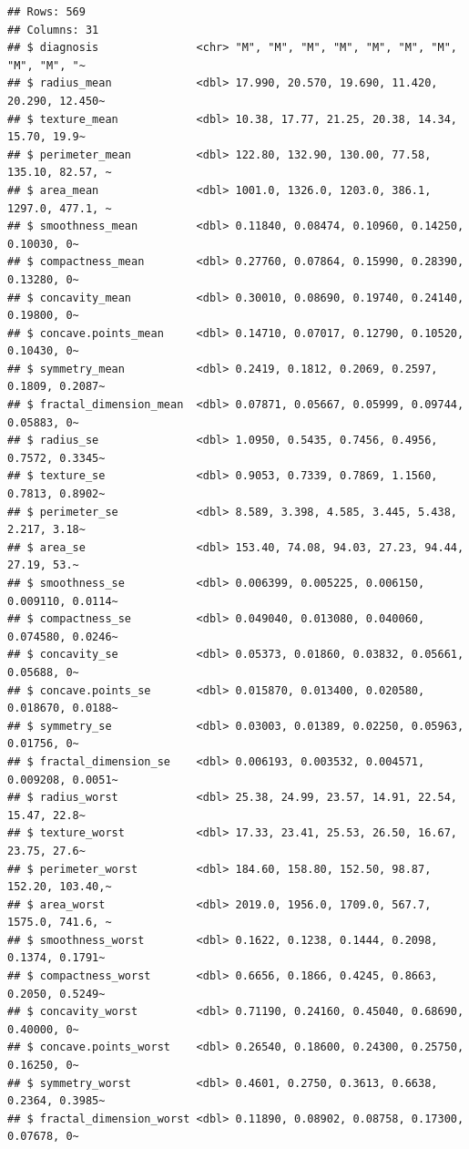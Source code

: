 \documentclass[
]{book}
\begin{document}
\begin{verbatim}
## Rows: 569
## Columns: 31
## $ diagnosis               <chr> "M", "M", "M", "M", "M", "M", "M", "M", "M", "~
## $ radius_mean             <dbl> 17.990, 20.570, 19.690, 11.420, 20.290, 12.450~
## $ texture_mean            <dbl> 10.38, 17.77, 21.25, 20.38, 14.34, 15.70, 19.9~
## $ perimeter_mean          <dbl> 122.80, 132.90, 130.00, 77.58, 135.10, 82.57, ~
## $ area_mean               <dbl> 1001.0, 1326.0, 1203.0, 386.1, 1297.0, 477.1, ~
## $ smoothness_mean         <dbl> 0.11840, 0.08474, 0.10960, 0.14250, 0.10030, 0~
## $ compactness_mean        <dbl> 0.27760, 0.07864, 0.15990, 0.28390, 0.13280, 0~
## $ concavity_mean          <dbl> 0.30010, 0.08690, 0.19740, 0.24140, 0.19800, 0~
## $ concave.points_mean     <dbl> 0.14710, 0.07017, 0.12790, 0.10520, 0.10430, 0~
## $ symmetry_mean           <dbl> 0.2419, 0.1812, 0.2069, 0.2597, 0.1809, 0.2087~
## $ fractal_dimension_mean  <dbl> 0.07871, 0.05667, 0.05999, 0.09744, 0.05883, 0~
## $ radius_se               <dbl> 1.0950, 0.5435, 0.7456, 0.4956, 0.7572, 0.3345~
## $ texture_se              <dbl> 0.9053, 0.7339, 0.7869, 1.1560, 0.7813, 0.8902~
## $ perimeter_se            <dbl> 8.589, 3.398, 4.585, 3.445, 5.438, 2.217, 3.18~
## $ area_se                 <dbl> 153.40, 74.08, 94.03, 27.23, 94.44, 27.19, 53.~
## $ smoothness_se           <dbl> 0.006399, 0.005225, 0.006150, 0.009110, 0.0114~
## $ compactness_se          <dbl> 0.049040, 0.013080, 0.040060, 0.074580, 0.0246~
## $ concavity_se            <dbl> 0.05373, 0.01860, 0.03832, 0.05661, 0.05688, 0~
## $ concave.points_se       <dbl> 0.015870, 0.013400, 0.020580, 0.018670, 0.0188~
## $ symmetry_se             <dbl> 0.03003, 0.01389, 0.02250, 0.05963, 0.01756, 0~
## $ fractal_dimension_se    <dbl> 0.006193, 0.003532, 0.004571, 0.009208, 0.0051~
## $ radius_worst            <dbl> 25.38, 24.99, 23.57, 14.91, 22.54, 15.47, 22.8~
## $ texture_worst           <dbl> 17.33, 23.41, 25.53, 26.50, 16.67, 23.75, 27.6~
## $ perimeter_worst         <dbl> 184.60, 158.80, 152.50, 98.87, 152.20, 103.40,~
## $ area_worst              <dbl> 2019.0, 1956.0, 1709.0, 567.7, 1575.0, 741.6, ~
## $ smoothness_worst        <dbl> 0.1622, 0.1238, 0.1444, 0.2098, 0.1374, 0.1791~
## $ compactness_worst       <dbl> 0.6656, 0.1866, 0.4245, 0.8663, 0.2050, 0.5249~
## $ concavity_worst         <dbl> 0.71190, 0.24160, 0.45040, 0.68690, 0.40000, 0~
## $ concave.points_worst    <dbl> 0.26540, 0.18600, 0.24300, 0.25750, 0.16250, 0~
## $ symmetry_worst          <dbl> 0.4601, 0.2750, 0.3613, 0.6638, 0.2364, 0.3985~
## $ fractal_dimension_worst <dbl> 0.11890, 0.08902, 0.08758, 0.17300, 0.07678, 0~
\end{verbatim}
\end{document}
